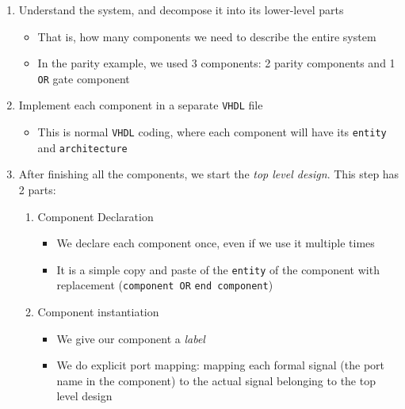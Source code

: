 \begin{enumerate}

\item Understand the system, and decompose it into its lower-level parts

	\begin{itemize}
	\item That is, how many components we need to describe the entire system
	
	\item In the parity example, we used 3 components: 2 parity components and 1 \verb|OR| gate component
	\end{itemize}


\item Implement each component in a separate \verb|VHDL| file

	\begin{itemize}
	\item This is normal \verb|VHDL| coding, where each component will have its \verb|entity| and \verb|architecture|
	\end{itemize}

\item After finishing all the components, we start the \textit{top level design}. This step has 2 parts:

	\begin{enumerate}
	\item Component Declaration 
	
		\begin{itemize}
		\item We declare each component once, even if we use it multiple times
		
		\item It is a simple copy and paste of the \verb|entity| of the component with replacement (\verb|component OR|  \verb|end component|)
		\end{itemize}		
	
	\item Component instantiation
	
		\begin{itemize}
		\item We give our component a \textit{label}
		
		\item We do explicit port mapping: mapping each formal signal (the port name in the component) to the actual signal belonging to the top level design
		\end{itemize}
	
	\end{enumerate}

\end{enumerate}

